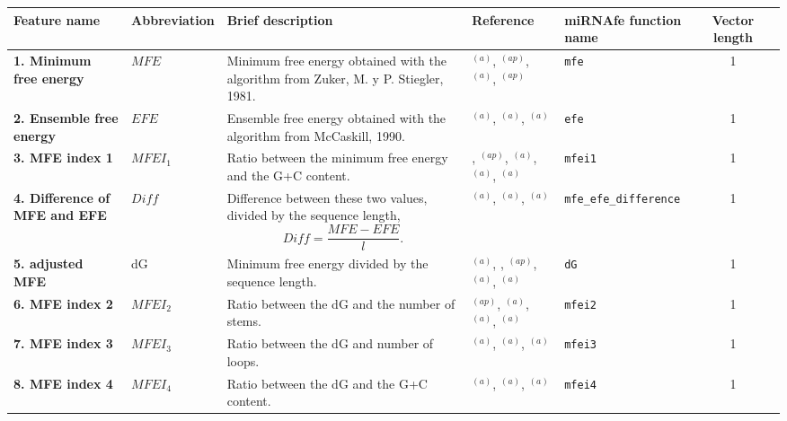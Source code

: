 \documentclass[a4paper,10pt]{article}
\begin{document}
\small
\begin{longtable}{ >{\raggedright\arraybackslash}p{4.2cm}  p{1.6cm}  p{5.8cm}  p{1.8cm}  l  cp{1cm} }
 \toprule
 Feature name & Abbreviation & \centering Brief description & Reference & miRNAfe function name  & Vector length \\
 \midrule
 \endhead
 \bottomrule
 \endlastfoot

\bfseries{1. Minimum free energy} & $MFE$ & Minimum free energy obtained with the algorithm from Zuker, M. y P. Stiegler, 1981. & \cite{SP05}$^{(a)}$, \cite{PH07}$^{(ap)}$, \cite{HF07}$^{(a)}$, \cite{MM09}$^{(ap)}$ & \verb|mfe| & 1 \\

\bfseries{2. Ensemble free energy} & $EFE$ & Ensemble free energy obtained with the algorithm from McCaskill, 1990. & \cite{RV09}$^{(a)}$, \cite{JS10}$^{(a)}$, \cite{PM11}$^{(a)}$ & \verb|efe| & 1 \\

\bfseries{3. MFE index 1} & $MFEI_1$ & Ratio between the minimum free energy and the G+C content. & \cite{ZP06}, \cite{KS07}$^{(ap)}$, \cite{RV09}$^{(a)}$, \cite{JS10}$^{(a)}$, \cite{PM11}$^{(a)}$ & \verb|mfei1| & 1 \\

 \bfseries{4. Difference of MFE and EFE} & $Diff$ & Difference between these two values, divided by the sequence length,
$$ Diff = \frac{MFE - EFE}{l} .$$
& \cite{RV09}$^{(a)}$, \cite{JS10}$^{(a)}$, \cite{PM11}$^{(a)}$ & \verb|mfe_efe_difference| & 1 \\

\bfseries{5. adjusted MFE} & dG & Minimum free energy divided by the sequence length. & \cite{GT07}$^{(a)}$, \cite{ZP06}, \cite{KS07}$^{(ap)}$, \cite{JS10}$^{(a)}$, \cite{PM11}$^{(a)}$ & \verb|dG| & 1 \\

\bfseries{6. MFE index 2} & $MFEI_2$ & Ratio between the dG and the number of stems. & \cite{KS07}$^{(ap)}$, \cite{RV09}$^{(a)}$, \cite{JS10}$^{(a)}$, \cite{PM11}$^{(a)}$ & \verb|mfei2| & 1 \\

\bfseries{7. MFE index 3} & $MFEI_3$ & Ratio between the dG and number of loops. & \cite{RV09}$^{(a)}$, \cite{JS10}$^{(a)}$, \cite{PM11}$^{(a)}$ & \verb|mfei3| & 1 \\

\bfseries{8. MFE index 4} & $MFEI_4$ & Ratio between the dG and the G+C content. & \cite{RV09}$^{(a)}$, \cite{JS10}$^{(a)}$, \cite{PM11}$^{(a)}$ & \verb|mfei4| & 1 \\


\end{longtable}
\end{document}
